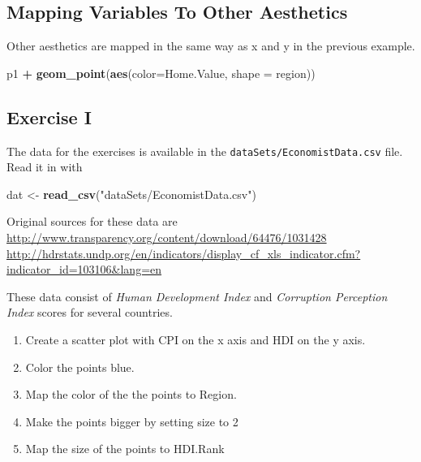 \documentclass[]{book}
\newenvironment{Shaded}{\begin{snugshade}}{\end{snugshade}}
\newcommand{\KeywordTok}[1]{\textcolor[rgb]{0.13,0.29,0.53}{\textbf{#1}}}
\newcommand{\DataTypeTok}[1]{\textcolor[rgb]{0.13,0.29,0.53}{#1}}
\newcommand{\StringTok}[1]{\textcolor[rgb]{0.31,0.60,0.02}{#1}}
\newcommand{\OperatorTok}[1]{\textcolor[rgb]{0.81,0.36,0.00}{\textbf{#1}}}
\newcommand{\NormalTok}[1]{#1}
\providecommand{\tightlist}{%
  \setlength{\itemsep}{0pt}\setlength{\parskip}{0pt}}
\begin{document}
\subsection{Mapping Variables To Other
Aesthetics}\label{mapping-variables-to-other-aesthetics}

Other aesthetics are mapped in the same way as x and y in the previous
example.

\begin{Shaded}
\begin{Highlighting}[]
\NormalTok{p1 }\OperatorTok{+}
\StringTok{  }\KeywordTok{geom_point}\NormalTok{(}\KeywordTok{aes}\NormalTok{(}\DataTypeTok{color=}\NormalTok{Home.Value, }\DataTypeTok{shape =}\NormalTok{ region))}
\end{Highlighting}
\end{Shaded}

\subsection{Exercise I}\label{exercise-i}

The data for the exercises is available in the
\texttt{dataSets/EconomistData.csv} file. Read it in with

\begin{Shaded}
\begin{Highlighting}[]
\NormalTok{dat <-}\StringTok{ }\KeywordTok{read_csv}\NormalTok{(}\StringTok{"dataSets/EconomistData.csv"}\NormalTok{)}
\end{Highlighting}
\end{Shaded}

Original sources for these data are
\url{http://www.transparency.org/content/download/64476/1031428}
\url{http://hdrstats.undp.org/en/indicators/display_cf_xls_indicator.cfm?indicator_id=103106\&lang=en}

These data consist of \emph{Human Development Index} and
\emph{Corruption Perception Index} scores for several countries.

\begin{enumerate}
\def\labelenumi{\arabic{enumi}.}
\tightlist
\item
  Create a scatter plot with CPI on the x axis and HDI on the y axis.
\item
  Color the points blue.
\item
  Map the color of the the points to Region.
\item
  Make the points bigger by setting size to 2
\item
  Map the size of the points to HDI.Rank
\end{enumerate}
\end{document}
